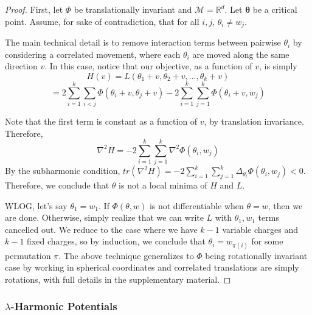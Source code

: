 \documentclass{article}
\newcommand{\R}{{\mathbb{R}}}
\begin{document}
\begin{proof}
First, let $\Phi$ be translationally invariant and $\mathcal{M} = \R^d$. Let $\boldsymbol{\theta}$ be a critical point. Assume, for sake of contradiction, that for all $i, j$, $\theta_i \neq w_j$. 

The main technical detail is to remove interaction terms between pairwise $\theta_i$ by considering a correlated movement, where each $\theta_i$ are moved along the same direction $v$. In this case, notice that our objective, as a function of $v$, is simply
\[H(v) = L(\theta_1+ v, \theta_2 + v, ...,\theta_k + v)\]
\[ =  2\sum_{i=1}^k\sum_{i < j} \Phi(\theta_i+v,\theta_j+v) - 2\sum_{i=1}^k\sum_{j=1}^k \Phi(\theta_i+v,w_j)\]

Note that the first term is constant as a function of $v$, by translation invariance. Therefore,
\[\nabla^2 H = -2\sum_{i=1}^k \sum_{j=1}^k \nabla^2\Phi(\theta_i, w_j)\]
By the subharmonic condition, $tr(\nabla^2H) = -2\sum_{i=1}^k\sum_{j=1}^k \Delta_{\theta_i}\Phi(\theta_i,w_j) < 0$. Therefore, we conclude that $\theta$ is not a local minima of $H$ and $L$.

WLOG, let's say $\theta_1 = w_1$. If $\Phi(\theta, w)$ is not differentiable when $\theta = w$, then we are done. Otherwise, simply realize that we can write $L$ with $\theta_1,w_1$ terms cancelled out. We reduce to the case where we have $k-1$ variable charges and $k-1$ fixed charges, so by induction, we conclude that $\theta_i = w_{\pi(i)}$ for some permutation $\pi$. The above technique generalizes to $\Phi$ being rotationally invariant case by working in spherical coordinates and correlated translations are simply rotations, with full details in the supplementary material.
\end{proof}
%
\subsubsection{$\lambda$-Harmonic Potentials}
\end{document}
